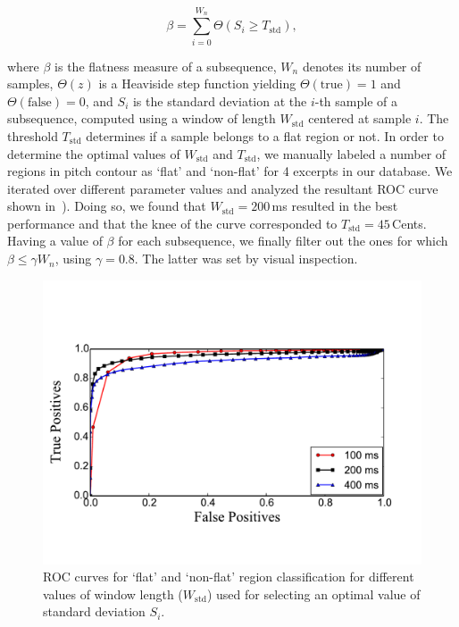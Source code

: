 \begin{equation}
\label{eq:flatness_measure}
\beta =\sum_{i=0}^{W_n} \Theta\left(S_i\geq T_{\text{std}}\right),
\end{equation}


\noindent where $\beta$ is the flatness measure of a subsequence, $W_n$ denotes its number of samples, $\Theta(z)$ is a Heaviside step function yielding $\Theta(\text{true})\!=\!1$ and $\Theta(\text{false})\!=\!0$, and $S_i$ is the standard deviation at the $i$-th sample of a subsequence, computed using a window of length $W_{\text{std}}$ centered at sample $i$. The threshold $T_{\text{std}}$ determines if a sample belongs to a flat region or not. In order to determine the optimal values of $W_{\text{std}}$ and $T_{\text{std}}$, we manually labeled a number of regions in pitch contour as `flat' and `non-flat' for 4 excerpts in our database. We iterated over different parameter values and analyzed the resultant ROC curve shown in~). %
Doing so, we found that $W_{\text{std}}=200$\,ms resulted in the best performance and that the knee of the curve corresponded to $T_{\text{std}}=45$\,Cents. Having a value of $\beta$ for each subsequence, we finally filter out the ones for which $\beta \leq \gamma W_n$, using $\gamma = 0.8$. The latter was set by visual inspection.

\begin{figure}
	\begin{center}
		\includegraphics[width=\figSizeEightyFive]{ch06_patterns/figures/discovery/ROCFlatness.pdf}
	\end{center}
	\caption{ROC curves for `flat' and `non-flat' region classification for different values of window length ($W_{\text{std}}$) used for selecting an optimal value of standard deviation $S_i$.}
	\label{fig:ROC_pattern_discovery}
\end{figure}

